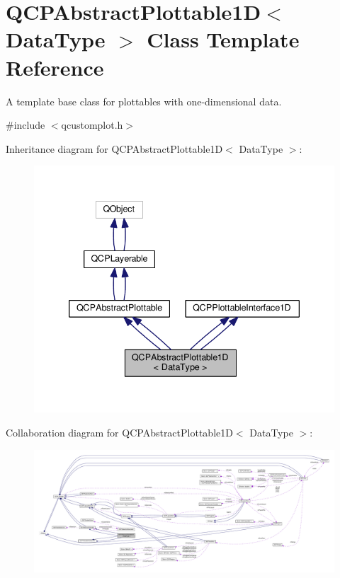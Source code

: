 \hypertarget{class_q_c_p_abstract_plottable1_d}{}\section{Q\+C\+P\+Abstract\+Plottable1D$<$ Data\+Type $>$ Class Template Reference}
\label{class_q_c_p_abstract_plottable1_d}


A template base class for plottables with one-\/dimensional data.  




{\ttfamily \#include $<$qcustomplot.\+h$>$}



Inheritance diagram for Q\+C\+P\+Abstract\+Plottable1D$<$ Data\+Type $>$\+:\nopagebreak
\begin{figure}[H]
\begin{center}
\leavevmode
\includegraphics[width=339pt]{class_q_c_p_abstract_plottable1_d__inherit__graph}
\end{center}
\end{figure}


Collaboration diagram for Q\+C\+P\+Abstract\+Plottable1D$<$ Data\+Type $>$\+:\nopagebreak
\begin{figure}[H]
\begin{center}
\leavevmode
\includegraphics[width=350pt]{class_q_c_p_abstract_plottable1_d__coll__graph}
\end{center}
\end{figure}
